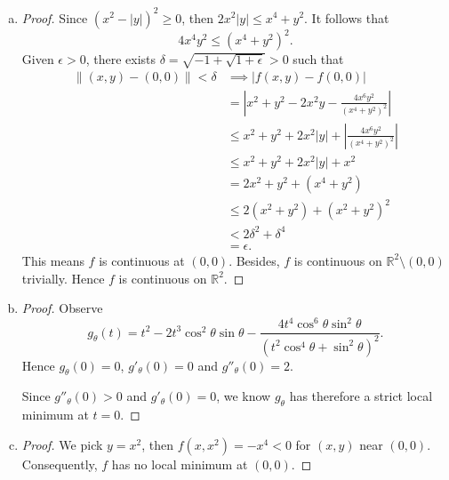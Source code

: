 \begin{Exercise}
	\begin{enumerate}[(a)]
		\item
		\begin{proof}
			Since $(x^2-|y|)^2 \geq 0$, then $2x^2 |y| \leq x^4+y^2$.
			It follows that
			$$
			4x^4y^2\leq (x^4+y^2)^2.
			$$
			Given $\epsilon > 0$, there exists $\delta = \sqrt{-1+\sqrt{1+\epsilon} } > 0$ such that
			\begin{align*}
			\| (x,y) - (0,0) \| < \delta 
			&\implies | f(x,y) - f(0,0) | \\
			&= \left| x^2 + y^2 -2x^2 y - \frac{4x^6 y^2}{(x^4+y^2)^2} \right| \\
			&\leq x^2 + y^2 + 2x^2 |y| + \left| \frac{4x^6 y^2}{(x^4+y^2)^2} \right| \\
			&\leq x^2 + y^2 + 2x^2 |y| + x^2 \\
			&= 2x^2 + y^2 + (x^4+y^2) \\
			&\leq 2(x^2+y^2) + (x^2+y^2)^2 \\
			&< 2\delta^2 + \delta^4 \\
			&= \epsilon.
			\end{align*}
			This means $f$ is continuous at $(0,0)$.
			Besides, $f$ is continuous on $\mathbb{R}^2\setminus (0,0)$ trivially.
			Hence $f$ is continuous on $\mathbb{R}^2$.
		\end{proof}
		
		\item
		\begin{proof}
			Observe
			$$
			g_{\theta}(t) = t^2-2t^3\cos^2 \theta \sin \theta - \frac{4t^4\cos^6\theta\sin^2\theta}{(t^2\cos^4\theta+\sin^2\theta)^2}.
			$$
			Hence $g_{\theta}(0) = 0$, $g'_{\theta}(0) = 0$ and $g''_{\theta}(0) = 2$.
			
			Since $g''_{\theta}(0) > 0$ and $g'_{\theta}(0) = 0$, we know $g_{\theta}$ has therefore a strict local minimum at $t=0$.
		\end{proof}
		
		\item
		\begin{proof}
			We pick $y = x^2$, then $f(x,x^2) = -x^4 < 0$ for $(x,y)$ near $(0,0)$.
			Consequently, $f$ has no local minimum at $(0,0)$.
		\end{proof}
	\end{enumerate}
\end{Exercise}